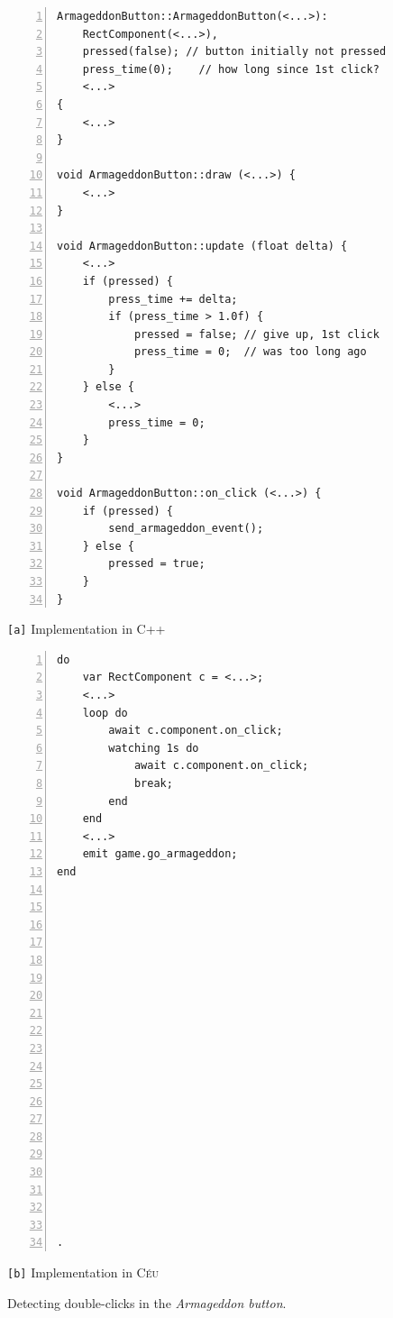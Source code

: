 \documentclass{vgtc}                          %
\newcommand{\CEU}{\textsc{C\'{e}u}\xspace}
\newcommand{\code}[1] {{\small{\texttt{#1}}}}
\newcommand{\ax}{\code{[a]}\xspace}
\newcommand{\bx}{\code{[b]}\xspace}
\begin{document}
\begin{figure}[t]
\begin{minipage}[t]{0.55\linewidth}
\begin{lstlisting}[numbers=left,xleftmargin=3em]
ArmageddonButton::ArmageddonButton(<...>):
    RectComponent(<...>),
    pressed(false); // button initially not pressed
    press_time(0);    // how long since 1st click?
    <...>
{
    <...>
}

void ArmageddonButton::draw (<...>) {
    <...>
}

void ArmageddonButton::update (float delta) {
    <...>
    if (pressed) {
        press_time += delta;
        if (press_time > 1.0f) {
            pressed = false; // give up, 1st click
            press_time = 0;  // was too long ago
        }
    } else {
        <...>
        press_time = 0;
    }
}

void ArmageddonButton::on_click (<...>) {
    if (pressed) {
        send_armageddon_event();
    } else {
        pressed = true;
    }
}
\end{lstlisting}
\centering\small{\ax Implementation in C++}
\end{minipage}
%
\begin{minipage}[t]{0.45\linewidth}
\begin{lstlisting}[numbers=left,xleftmargin=3em]
do
    var RectComponent c = <...>;
    <...>
    loop do
        await c.component.on_click;
        watching 1s do
            await c.component.on_click;
            break;
        end
    end
    <...>
    emit game.go_armageddon;
end




















.
\end{lstlisting}
\centering\small{\bx Implementation in \CEU}
\end{minipage}
\caption{ Detecting double-clicks in the \emph{Armageddon button}.
\label{lst.armageddon}
}
\end{figure}
\end{document}
